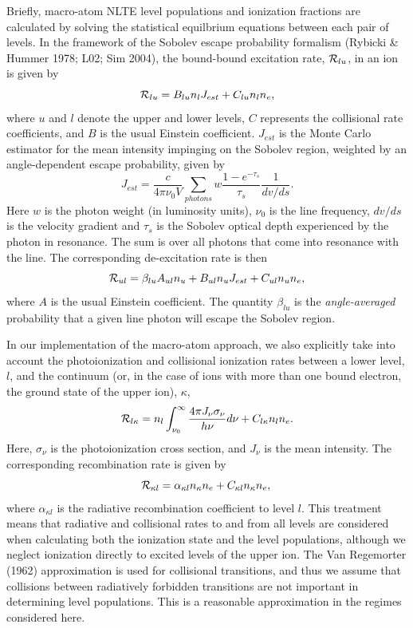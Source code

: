 \documentclass[preprint, a4paper, 11pt]{aastex}
\begin{document}
Briefly, macro-atom NLTE level populations and ionization fractions
are calculated by solving the statistical equilbrium equations between
each pair of levels. In the framework of the Sobolev escape probability formalism (Rybicki \& Hummer 1978; L02; Sim 2004), 
the bound-bound excitation rate, ${\cal R}_{lu}$, in an ion is given by 
\begin{equation}
{\cal R}_{lu} = B_{lu} n_l J_{est} + C_{lu} n_l n_e,
\end{equation}
where $u$ and $l$ denote the upper and lower levels, $C$ represents the
collisional rate coefficients, and $B$ is the usual Einstein
coefficient. $J_{est}$ is the Monte Carlo estimator for the mean intensity 
impinging on the Sobolev region, weighted by an angle-dependent escape probability, 
given by \citep{sim2004}
\begin{equation}
J_{est} = \frac{c}{4 \pi \nu_0 V} \sum_{photons} w \frac{1 - e^{-\tau_s}}{\tau_s} \frac{1}{dv/ds}.
\end{equation}
Here $w$ is the photon weight (in luminosity units), $\nu_0$
is the line frequency, $dv/ds$ is the velocity gradient and
$\tau_s$ is the Sobolev optical depth experienced by the photon in resonance.
The sum is over all photons that come into resonance with the line.
The corresponding de-excitation rate is then 
\begin{equation}
{\cal R}_{ul} = \beta_{lu} A_{ul} n_u + B_{ul} n_u J_{est} +
C_{ul} n_u n_e,
\label{eq:nlte_rul}
\end{equation}
where $A$ is the usual Einstein coefficient. 
The quantity $\beta_{lu}$ is the {\em angle-averaged} probability 
that a given line photon will escape the Sobolev region.

In our implementation of the macro-atom approach, we also explicitly
take into account the photoionization and collisional ionization rates
between a lower level, $l$, and the continuum (or, in the case of ions
with more than one bound electron, the ground state of the upper ion),
$\kappa$,
\begin{equation}
{\cal R}_{l \kappa}= n_l \int_{\nu_0}^{\infty} \frac{ 4 \pi J_{\nu}
  \sigma_{\nu}}{h \nu} d\nu + C_{l \kappa} n_l n_e.
\end{equation}
Here, $\sigma_{\nu}$ is the photoionization cross section, and $J_{\nu}$
is the mean intensity. The corresponding recombination rate is given
by 
\begin{equation}
{\cal R}_{\kappa l} = \alpha_{\kappa l} n_{\kappa} n_e + C_{\kappa l}
n_\kappa n_e, \\
\end{equation}
where $\alpha_{\kappa l}$ is the radiative recombination coefficient
to level $l$. This treatment means that radiative and collisional
rates to and from all levels are considered when calculating both the
ionization state and the level populations, although we neglect 
ionization directly to excited levels of the upper ion. The
Van Regemorter (1962) approximation is used for collisional
transitions, and thus we assume that collisions between radiatively
forbidden transitions are not important in determining level
populations. This is a reasonable approximation in the regimes
considered here.
\end{document}
